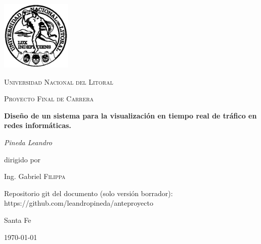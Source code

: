 \documentclass[a4paper,10pt, oneside]{book}
\begin{document}
\begin{titlepage}
	\centering
	\includegraphics[width=0.25\textwidth]{Universidad_del_Litoral}\par\vspace{1cm}
	{\scshape\LARGE Universidad Nacional del Litoral \par}
	\vspace{1cm}
	{\scshape\Large Proyecto Final de Carrera\par}
	\vspace{1.5cm}
	{\huge\bfseries Diseño de un sistema para la visualización en tiempo real de tráfico en redes informáticas.\par}
	\vspace{2cm}
	{\Large\itshape Pineda Leandro\par}
	\vfill
	dirigido por\par
	Ing. Gabriel \textsc{Filippa}

	\vfill
	
	Repositorio git del documento (solo versión borrador): https://github.com/leandropineda/anteproyecto
	
	\vfill
	
	\large Santa Fe\par
	{\large \today\par}
	
\end{titlepage}

\modulolinenumbers[5]
\linenumbers




\newpage
 
\nocite{*}
\printbibliography
\end{document}
